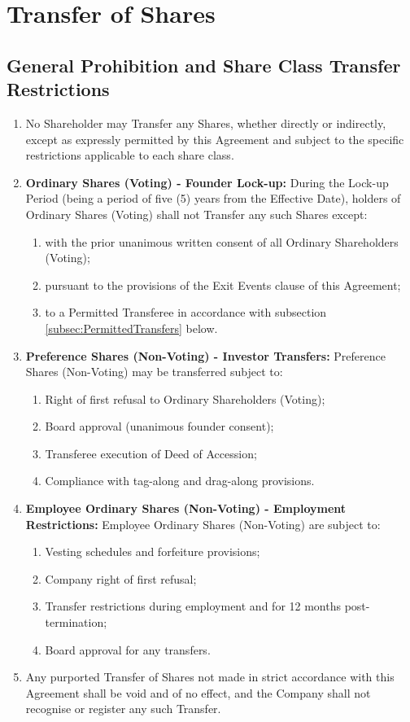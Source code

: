 \section{Transfer of Shares}

\subsection{General Prohibition and Share Class Transfer Restrictions}
\begin{enumerate}[label=(\alph*)]
\item No Shareholder may Transfer any Shares, whether directly or indirectly, except as expressly permitted by this Agreement and subject to the specific restrictions applicable to each share class.
\item \textbf{Ordinary Shares (Voting) - Founder Lock-up:} During the Lock-up Period (being a period of five (5) years from the Effective Date), holders of Ordinary Shares (Voting) shall not Transfer any such Shares except:
    \begin{enumerate}[label=(\roman*)]
    \item with the prior unanimous written consent of all Ordinary Shareholders (Voting);
    \item pursuant to the provisions of the Exit Events clause of this Agreement;
    \item to a Permitted Transferee in accordance with subsection \ref{subsec:PermittedTransfers} below.
    \end{enumerate}
\item \textbf{Preference Shares (Non-Voting) - Investor Transfers:} Preference Shares (Non-Voting) may be transferred subject to:
    \begin{enumerate}[label=(\roman*)]
    \item Right of first refusal to Ordinary Shareholders (Voting);
    \item Board approval (unanimous founder consent);
    \item Transferee execution of Deed of Accession;
    \item Compliance with tag-along and drag-along provisions.
    \end{enumerate}
\item \textbf{Employee Ordinary Shares (Non-Voting) - Employment Restrictions:} Employee Ordinary Shares (Non-Voting) are subject to:
    \begin{enumerate}[label=(\roman*)]
    \item Vesting schedules and forfeiture provisions;
    \item Company right of first refusal;
    \item Transfer restrictions during employment and for 12 months post-termination;
    \item Board approval for any transfers.
    \end{enumerate}
\item Any purported Transfer of Shares not made in strict accordance with this Agreement shall be void and of no effect, and the Company shall not recognise or register any such Transfer.
\end{enumerate}

